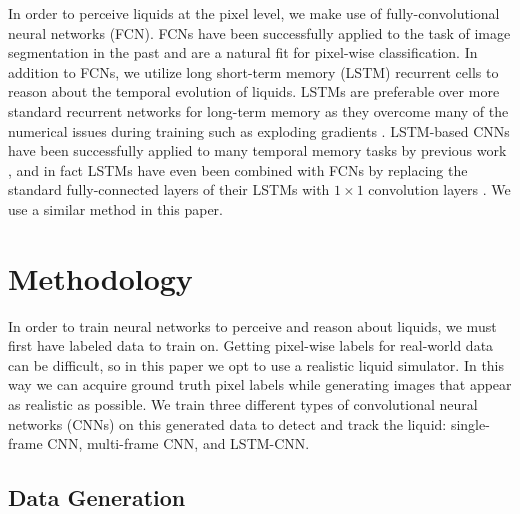 \documentclass[runningheads,a4paper]{llncs}
\begin{document}
In order to perceive liquids at the pixel level, we make use of
fully-convolutional neural networks (FCN). FCNs have been successfully applied
to the task of image segmentation in the past
\cite{long2015,havaei2015,romera2015} and are a natural fit for pixel-wise
classification. In addition to FCNs, we utilize long short-term memory (LSTM)
\cite{hochreiter1997} recurrent cells to reason about the temporal evolution of
liquids. LSTMs are preferable over more standard recurrent networks for
long-term memory as they overcome many of the numerical issues during training
such as exploding gradients \cite{greff2015}. LSTM-based CNNs have been
successfully applied to many temporal memory tasks by previous work
\cite{junhyuk2015,romera2015}, and in fact LSTMs have even been combined with FCNs by replacing the standard fully-connected layers of their LSTMs with
$1\times1$ convolution layers \cite{romera2015}. We use a similar method in this paper.

\vspace{-0.3cm}
\section{Methodology}
\label{sec:methodology}
\vspace{-0.5cm}

In order to train neural networks to perceive and reason about liquids, we must first have labeled data to train on. 
Getting pixel-wise labels for real-world data can be difficult, so in this paper we opt to use a realistic liquid simulator. 
In this way we can acquire ground truth pixel labels while generating images that appear as realistic as possible.
We train three different types of convolutional neural networks (CNNs) on this generated data to detect and track the liquid: single-frame CNN, multi-frame CNN, and LSTM-CNN.

\vspace{-0.3cm}
\subsection{Data Generation}
\label{sec:data_gen}
\vspace{-0.3cm}
\end{document}
